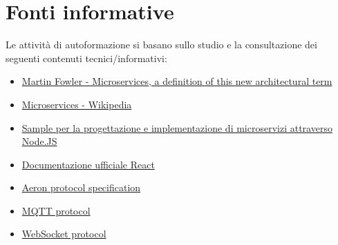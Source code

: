 \documentclass[a4paper]{article}
\begin{document}
\section*{Fonti informative}
Le attività di autoformazione si basano sullo studio e la consultazione dei seguenti contenuti tecnici/informativi:
\begin{itemize}
	\item \href{https://martinfowler.com/articles/microservices.html}{Martin Fowler - Microservices, a definition of this new architectural term}
	\item \href{https://en.wikipedia.org/wiki/Microservices}{Microservices - Wikipedia}
	\item \href{https://medium.com/@cramirez92/build-a-nodejs-cinema-microservice-and-deploying-it-with-docker-part-1}{Sample per la progettazione e implementazione di microservizi attraverso Node.JS}
	
	\item \href{https://reactjs.org/docs/}{Documentazione ufficiale React}
	
	\item \href{https://github.com/real-logic/aeron/wiki/Protocol-Specification}{Aeron protocol specification}
	
	\item \href{https://github.com/mqtt/mqtt.github.io/wiki}{MQTT protocol}
	
	\item \href{https://websocket.org/}{WebSocket protocol}
	
\end{itemize}
\end{document}
